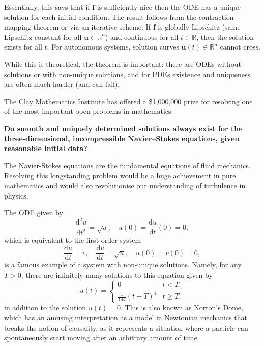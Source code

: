 \documentclass[
  letterpaper,
  DIV=11,
  numbers=noendperiod]{scrreprt}
\newenvironment{fbxSimple}[3]{\begin{tcolorbox}[enhanced, breakable,%
attach boxed title to top*={xshift=1.4pt},
boxed title style={boxrule=0.0mm, fuzzy shadow={1pt}{-1pt}{0mm}{0.1mm}{gray}, arc=.3em, rounded corners=east, sharp corners=west}, colframe=#1-color2, colbacktitle=#1-color1, colback = white, coltitle=black,  titlerule=0mm, toprule=0pt, bottomrule=.7pt, leftrule=.3em, rightrule=.7pt, outer arc=.3em,  	left=.5em, right=.5em, bottomtitle=1mm, toptitle=1mm,title=\textbf{#2}\hspace{0.5em}{#3}]}
{\end{tcolorbox}}
\begin{document}
Essentially, this says that if \(\mathbf{f}\) is sufficiently nice then
the ODE has a unique solution for each initial condition. The result
follows from the contraction-mapping theorem or via an iterative scheme.
If \(\mathbf{f}\) is globally Lipschitz (same Lipschitz constant for all
\(\mathbf{u}\in\mathbb{R}^n\)) and continuous for all
\(t\in\mathbb{R}\), then the solution exists for all \(t\). For
autonomous systems, solution curves \(\mathbf{u}(t)\in\mathbb{R}^n\)
cannot cross.

While this is theoretical, the theorem is important: there are ODEs
without solutions or with non-unique solutions, and for PDEs existence
and uniqueness are often much harder (and can fail).

\begin{tcolorbox}[enhanced jigsaw, opacityback=0, breakable, title=\textcolor{quarto-callout-note-color}{\faInfo}\hspace{0.5em}{Millennium Prize Problem: Navier--Stokes Equations}, arc=.35mm, coltitle=black, opacitybacktitle=0.6, bottomrule=.15mm, leftrule=.75mm, left=2mm, colbacktitle=quarto-callout-note-color!10!white, titlerule=0mm, toptitle=1mm, bottomtitle=1mm, colframe=quarto-callout-note-color-frame, rightrule=.15mm, colback=white, toprule=.15mm]

The Clay Mathematics Institute has offered a \$1,000,000 prize for
resolving one of the most important open problems in mathematics:

\textbf{Do smooth and uniquely determined solutions always exist for the
three-dimensional, incompressible Navier--Stokes equations, given
reasonable initial data?}

The Navier-Stokes equations are the fundamental equations of fluid
mechanics. Resolving this longstanding problem would be a huge
achievement in pure mathematics and would also revolutionise our
understanding of turbulence in physics.

\end{tcolorbox}

\label{eg-5.1}
\begin{fbxSimple}{eg}{Example 5.1}{}
\label{eg-5.1}
The ODE given by \[
\frac{\mathrm{d}^2u}{\mathrm{d}t^2} = \sqrt{u}, \quad u(0) = \frac{\mathrm{d}u}{\mathrm{d}t}(0) = 0,
\] which is equivalent to the first-order system \[
\frac{\mathrm{d}u}{\mathrm{d}t} = v, \quad \frac{\mathrm{d}v}{\mathrm{d}t} = \sqrt{u}, \quad u(0) = v(0) = 0,
\] is a famous example of a system with non-unique solutions. Namely,
for any \(T > 0\), there are infinitely many solutions to this equation
given by \[
u(t) = \begin{cases}
    0 & t < T,\\
    \frac{1}{144}(t-T)^4 & t \geq T,
\end{cases}
\] in addition to the solution \(u(t) = 0\). This is also known as
\href{https://arxiv.org/abs/1801.01719v3}{Norton's Dome}, which has an
amusing interpretation as a model in Newtonian mechanics that breaks the
notion of causality, as it represents a situation where a particle can
spontaneously start moving after an arbitrary amount of time.

\end{fbxSimple}
\end{document}
